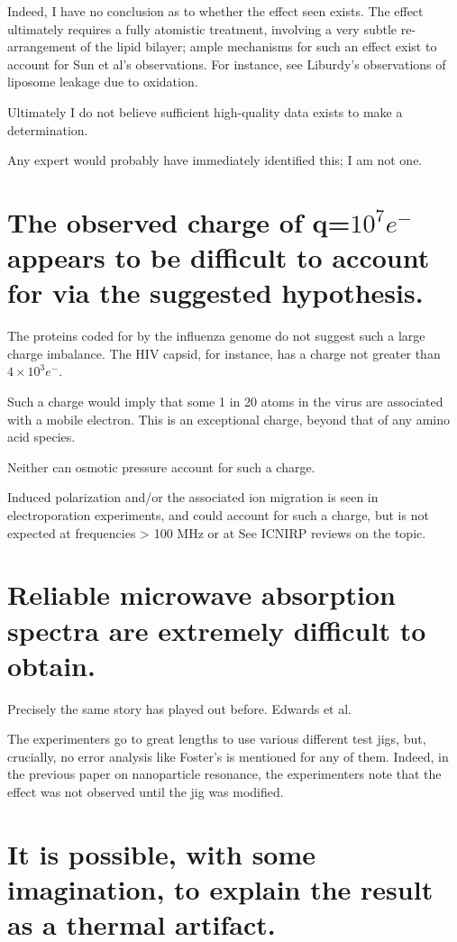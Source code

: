 \documentclass[fleqn,10pt]{paper}
\begin{document}
Indeed, I have no conclusion as to whether the effect seen exists. The effect ultimately requires a 
fully atomistic treatment, involving a very subtle re-arrangement of the lipid bilayer; ample 
mechanisms for such an effect exist to account for Sun et al's observations. For instance, see 
Liburdy's observations of liposome leakage due to oxidation.

Ultimately I do not believe sufficient high-quality data exists to make a determination.

Any expert would probably have immediately identified this; I am not one. 

\section{The observed charge of q=$10^7 e^-$ appears to be difficult to account for via the 
suggested hypothesis.}

The proteins coded for by the influenza genome do not suggest such a large charge imbalance. The 
HIV capsid, for instance, has a charge not greater than $4\times 10^3 e^-$.

Such a charge would imply that some 1 in 20 atoms in the virus are associated with a mobile 
electron. This is an exceptional charge, beyond that of any amino acid species.

Neither can osmotic pressure account for such a charge. 

Induced polarization and/or the associated ion migration is seen in electroporation experiments, 
and could account for such a charge, but is not expected at frequencies > 100 MHz or at  See ICNIRP 
reviews on the topic.

\section{Reliable microwave absorption spectra are extremely difficult to obtain.}

Precisely the same story has played out before. Edwards et al. 

The experimenters go to great lengths to use various different test jigs, but, crucially, no error analysis like Foster's is mentioned for any of them. Indeed, in the previous paper on nanoparticle resonance, the experimenters note that the effect was not observed until the jig was modified.

\section{It is possible, with some imagination, to explain the result as a thermal artifact.}
\end{document}
